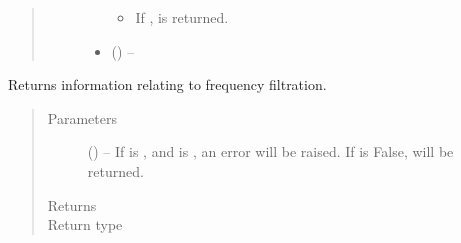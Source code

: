 \documentclass[letterpaper,10pt,english]{sphinxmanual}
\begin{document}
\begin{fulllineitems}
\begin{fulllineitems}
\begin{quote}
\begin{description}
\begin{itemize}
\begin{itemize}
\item {} 
\sphinxAtStartPar
If ,  is returned.

\end{itemize}


\item {} 
\sphinxAtStartPar
{} (\sphinxstyleliteralemphasis{\sphinxupquote{, }}) – 

\end{itemize}

\end{description}\end{quote}

\end{fulllineitems}


\begin{fulllineitems}
\label{\detokenize{references/core:nmrespy.core.Estimator.get_filter_info}}
\sphinxAtStartPar
Returns information relating to frequency filtration.
\begin{quote}\begin{description}
\item[{Parameters}] \leavevmode
\sphinxAtStartPar
{} (\sphinxstyleliteralemphasis{\sphinxupquote{, }}) – If  is , and  is , an error will
be raised. If  is False,  will be returned.

\item[{Returns}] \leavevmode
\sphinxAtStartPar
{}

\item[{Return type}] \leavevmode
\sphinxAtStartPar
{\hyperref[\detokenize{references/freqfilter:nmrespy.freqfilter.FrequencyFilter}]{}}


\end{description}
\end{quote}
\end{fulllineitems}
\end{fulllineitems}
\end{document}
